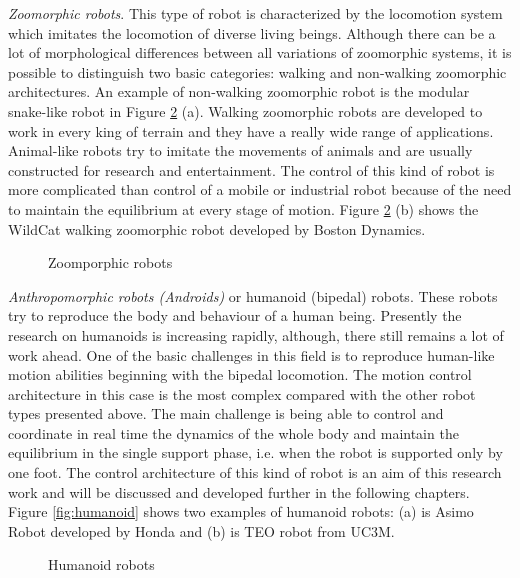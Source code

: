 \textit{Zoomorphic robots}. This type of robot is characterized by the locomotion system which imitates the locomotion of diverse living beings. Although there can be a lot of morphological differences between all variations of zoomorphic systems, it is possible to distinguish two basic categories: walking and non-walking zoomorphic architectures. An example of non-walking zoomorphic robot is the modular snake-like robot in Figure \ref{fig:zoo} (a). Walking zoomorphic robots are developed to work in every king of terrain and they have a really wide range of applications.
Animal-like robots try to imitate the movements of animals and are usually constructed for research and entertainment. The control of this kind of robot is more complicated than control of a mobile or industrial robot because of the need to maintain the equilibrium at every stage of motion. Figure \ref{fig:zoo} (b) shows the WildCat walking zoomorphic robot developed by Boston Dynamics.

\begin{figure}[!hbt]
\centering 
{}\hspace{10mm}
\caption{Zoomporphic robots}
\label{fig:zoo}
\end{figure}

\textit{Anthropomorphic robots (Androids)} or humanoid (bipedal) robots. These robots try to reproduce the body and behaviour of a human being. Presently the research on humanoids is increasing rapidly, although, there still remains a lot of work ahead. One of the basic challenges in this field is to reproduce human-like motion abilities beginning with the bipedal locomotion. The motion control architecture in this case is the most complex compared with the other robot types presented above. The main challenge is being able to control and coordinate in real time the dynamics of the whole body and maintain the equilibrium in the single support phase, i.e. when the robot is supported only by one foot. The control architecture of this kind of robot is an aim of this research work and will be discussed and developed further in the following chapters. Figure \ref{fig:humanoid} shows two examples of humanoid robots: (a) is Asimo Robot developed by Honda and (b) is TEO robot from UC3M.

\begin{figure}[!hbt]
\centering 
{}\hspace{10mm}
\caption{Humanoid robots}
\label{fig:zoo}
\end{figure}


